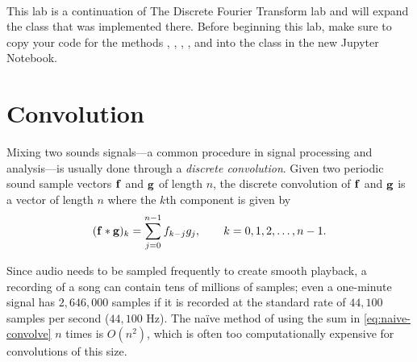 \\
\begin{warn}
This lab is a continuation of The Discrete Fourier Transform lab and will expand the  class that was implemented there.
Before beginning this lab, make sure to copy your code for the methods , , , , and  into the  class in the new Jupyter Notebook.
\end{warn}

\section*{Convolution} %

Mixing two sounds signals---a common procedure in signal processing and analysis---is usually done through a \emph{discrete convolution}.
Given two periodic sound sample vectors $\mathbf{f}$ and $\mathbf{g}$ of length $n$, the discrete convolution of $\mathbf{f}$ and $\mathbf{g}$ is a vector of length $n$ where the $k$th component is given by
\begin{align}
(\mathbf{f} \ast \mathbf{g})_k = \sum_{j=0}^{n-1} f_{k-j}g_j,\qquad k = 0,1,2,\dots,n-1.
\label{eq:naive-convolve}
\end{align}

Since audio needs to be sampled frequently to create smooth playback, a recording of a song can contain tens of millions of samples; even a one-minute signal has $2,646,000$ samples if it is recorded at the standard rate of $44,100$ samples per second ($44,100$ Hz).
The na\"ive method of using the sum in \eqref{eq:naive-convolve} $n$ times is $O(n^2)$, which is often too computationally expensive for convolutions of this size.

